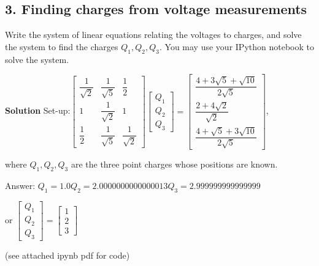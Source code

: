 \documentclass{article}\usepackage{amsmath,amssymb,amsthm,tikz,tkz-graph,color,chngpage,soul,hyperref,csquotes,graphicx,floatrow}\newcommand*{\QEDB}{\hfill\ensuremath{\square}}\newtheorem*{prop}{Proposition}\renewcommand{\theenumi}{\alph{enumi}}\usepackage[shortlabels]{enumitem}\usepackage[nobreak=true]{mdframed}\usetikzlibrary{matrix,calc}\MakeOuterQuote{"}\usepackage[margin=1in]{geometry} \newtheorem{theorem}{Theorem}
\begin{document}
\subsection*{3. Finding charges from voltage measurements}
Write the system of linear equations relating the voltages to charges, and solve the system to find the charges $Q_1, Q_2, Q_3$. You may use your IPython notebook to solve the system.
\begin{mdframed}
\textbf{Solution} Set-up:$\begin{bmatrix} \dfrac{1}{\sqrt{2}} & \dfrac{1}{\sqrt{5}} & \dfrac{1}{2} \\ 1 & \dfrac{1}{\sqrt{2}} & 1 \\ \dfrac{1}{2} & \dfrac{1}{\sqrt{5}} & \dfrac{1}{\sqrt{2}} \end{bmatrix} \begin{bmatrix} Q_1\\Q_2\\Q_3 \end{bmatrix} = \begin{bmatrix} \dfrac{4+3\sqrt{5}+\sqrt{10}}{2\sqrt{5}}\\ \dfrac{2+4\sqrt{2}}{\sqrt{2}}\\\dfrac{4+\sqrt{5}+3\sqrt{10}}{2\sqrt{5}} \end{bmatrix}$,

where $Q_1, Q_2, Q_3$ are the three point charges whose positions are known.

Answer: $Q_1 = 1.0  Q_2 = 2.0000000000000013  Q_3 = 2.999999999999999$

or $\begin{bmatrix} Q_1\\Q_2\\Q_3 \end{bmatrix} = \begin{bmatrix} 1\\2\\3\end{bmatrix}$

(see attached ipynb pdf for code)%
\end{mdframed}
\clearpage
\end{document}
